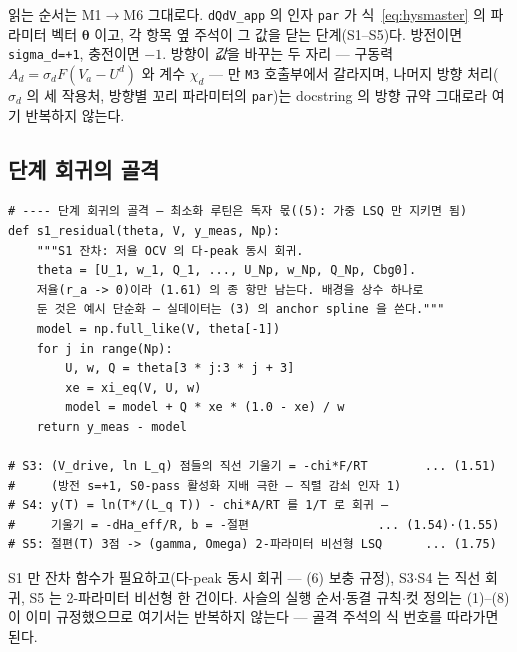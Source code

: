 \documentclass[11pt,a4paper]{article}
\begin{document}
읽는 순서는 M1$\to$M6 그대로다. \texttt{dQdV\_app} 의 인자 \texttt{par} 가 식~\eqref{eq:hysmaster}
의 파라미터 벡터 $\bm\theta$ 이고, 각 항목 옆 주석이 그 값을 닫는 단계(S1--S5)다. 방전이면
\texttt{sigma\_d=+1}, 충전이면 $-1$. 방향이 \emph{값}을 바꾸는 두 자리 — 구동력
$A_d=\sigma_dF(V_a-U^d)$ 와 계수 $\chi_d$ — 만 \texttt{M3} 호출부에서 갈라지며, 나머지 방향
처리($\sigma_d$ 의 세 작용처, 방향별 꼬리 파라미터의 \texttt{par})는 docstring 의 방향 규약
그대로라 여기 반복하지 않는다.

\subsection{단계 회귀의 골격}\label{sec:codestage}
\begin{footnotesize}
\begin{verbatim}
# ---- 단계 회귀의 골격 — 최소화 루틴은 독자 몫((5): 가중 LSQ 만 지키면 됨)
def s1_residual(theta, V, y_meas, Np):
    """S1 잔차: 저율 OCV 의 다-peak 동시 회귀.
    theta = [U_1, w_1, Q_1, ..., U_Np, w_Np, Q_Np, Cbg0].
    저율(r_a -> 0)이라 (1.61) 의 종 항만 남는다. 배경을 상수 하나로
    둔 것은 예시 단순화 — 실데이터는 (3) 의 anchor spline 을 쓴다."""
    model = np.full_like(V, theta[-1])
    for j in range(Np):
        U, w, Q = theta[3 * j:3 * j + 3]
        xe = xi_eq(V, U, w)
        model = model + Q * xe * (1.0 - xe) / w
    return y_meas - model

# S3: (V_drive, ln L_q) 점들의 직선 기울기 = -chi*F/RT        ... (1.51)
#     (방전 s=+1, S0-pass 활성화 지배 극한 — 직렬 감쇠 인자 1)
# S4: y(T) = ln(T*/(L_q T)) - chi*A/RT 를 1/T 로 회귀 —
#     기울기 = -dHa_eff/R, b = -절편                  ... (1.54)·(1.55)
# S5: 절편(T) 3점 -> (gamma, Omega) 2-파라미터 비선형 LSQ      ... (1.75)
\end{verbatim}
\end{footnotesize}

S1 만 잔차 함수가 필요하고(다-peak 동시 회귀 — (6) 보충 규정), S3$\cdot$S4 는 직선 회귀, S5 는
2-파라미터 비선형 한 건이다. 사슬의 실행 순서$\cdot$동결 규칙$\cdot$컷 정의는 (1)--(8)이 이미
규정했으므로 여기서는 반복하지 않는다 — 골격 주석의 식 번호를 따라가면 된다.
\end{document}

